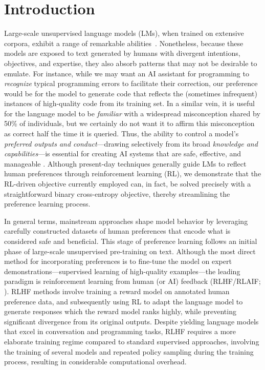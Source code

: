 \section{Introduction}
Large-scale unsupervised language models (LMs), when trained on extensive corpora, exhibit a range of remarkable abilities~\citep{chowdhery2022palm, brown2020language, touvron2023llama, bubeck2023sparks}. Nonetheless, because these models are exposed to text generated by humans with divergent intentions, objectives, and expertise, they also absorb patterns that may not be desirable to emulate. For instance, while we may want an AI assistant for programming to \textit{recognize} typical programming errors to facilitate their correction, our preference would be for the model to generate code that reflects the (sometimes infrequent) instances of high-quality code from its training set. In a similar vein, it is useful for the language model to be \textit{familiar} with a widespread misconception shared by 50\% of individuals, but we certainly do not want it to affirm this misconception as correct half the time it is queried. Thus, the ability to control a model’s \emph{preferred outputs and conduct}—drawing selectively from its broad \textit{knowledge and capabilities}—is essential for creating AI systems that are safe, effective, and manageable \citep{ouyang2022training}. Although present-day techniques generally guide LMs to reflect human preferences through reinforcement learning (RL), we demonstrate that the RL-driven objective currently employed can, in fact, be solved precisely with a straightforward binary cross-entropy objective, thereby streamlining the preference learning process.

In general terms, mainstream approaches shape model behavior by leveraging carefully constructed datasets of human preferences that encode what is considered safe and beneficial. This stage of preference learning follows an initial phase of large-scale unsupervised pre-training on text. Although the most direct method for incorporating preferences is to fine-tune the model on expert demonstrations—supervised learning of high-quality examples—the leading paradigm is reinforcement learning from human (or AI) feedback (RLHF/RLAIF; \citep{christiano2017deep,bai2022constitutional}). RLHF methods involve training a reward model on annotated human preference data, and subsequently using RL to adapt the language model to generate responses which the reward model ranks highly, while preventing significant divergence from its original outputs. Despite yielding language models that excel in conversation and programming tasks, RLHF requires a more elaborate training regime compared to standard supervised approaches, involving the training of several models and repeated policy sampling during the training process, resulting in considerable computational overhead.

